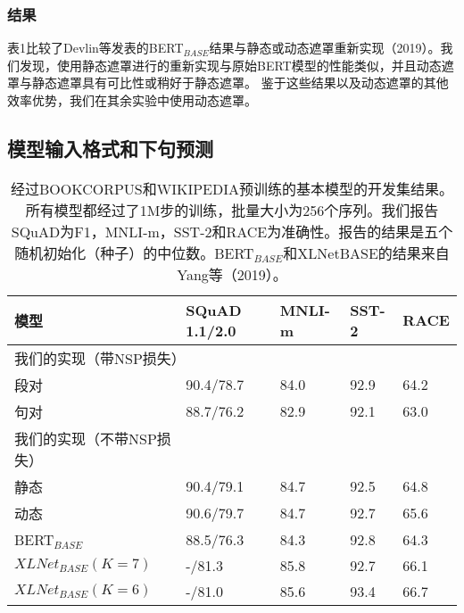 \documentclass[lang=cn,11pt,a4paper,twocolumn]{elegantpaper}
\begin{document}
\subsubsection{结果}
表1比较了Devlin等发表的BERT$_{BASE}$结果与静态或动态遮罩重新实现（2019）。我们发现，使用静态遮罩进行的重新实现与原始BERT模型的性能类似，并且动态遮罩与静态遮罩具有可比性或稍好于静态遮罩。
鉴于这些结果以及动态遮罩的其他效率优势，我们在其余实验中使用动态遮罩。

\subsection{模型输入格式和下句预测}

\begin{table*}[]
  \centering
  \begin{tabular}{lllll}
  \hline
  模型               & \textbf{SQuAD 1.1/2.0} & \textbf{MNLI-m} & \textbf{SST-2} & \textbf{RACE} \\ \hline
  \multicolumn{5}{l}{我们的实现（带NSP损失）}                                                            \\
  段对               & 90.4/78.7              & 84.0            & 92.9           & 64.2          \\
  句对               & 88.7/76.2              & 82.9            & 92.1           & 63.0          \\ \hline
  我们的实现（不带NSP损失）   &                        &                 &                &               \\
  静态               & 90.4/79.1              & 84.7            & 92.5           & 64.8          \\
  动态               & 90.6/79.7              & 84.7            & 92.7           & 65.6          \\ \hline
  BERT$_{BASE}$         & 88.5/76.3              & 84.3            & 92.8           & 64.3          \\
  $XLNet_{BASE}(K = 7)$ & -/81.3                 & 85.8            & 92.7           & 66.1          \\
  $XLNet_{BASE}(K = 6)$ & -/81.0                 & 85.6            & 93.4           & 66.7          \\ \hline
  \end{tabular}
  \caption{经过BOOKCORPUS和WIKIPEDIA预训练的基本模型的开发集结果。所有模型都经过了1M步的训练，批量大小为256个序列。我们报告SQuAD为F1，MNLI-m，SST-2和RACE为准确性。报告的结果是五个随机初始化（种子）的中位数。BERT$_{BASE}$和XLNetBASE的结果来自Yang等（2019）。}
\end{table*}
\end{document}
